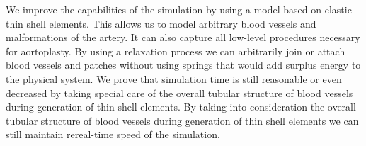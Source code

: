 We improve the capabilities of the simulation by using a model based on elastic thin shell elements.
This allows us to model arbitrary blood vessels and malformations of the artery.
It can also capture all low-level procedures necessary for aortoplasty.
By using a relaxation process we can arbitrarily join or attach blood vessels and patches without using springs that would add surplus energy to the physical system.
We prove that simulation time is still reasonable or even decreased by taking special care of the overall tubular structure of blood vessels during generation of thin shell elements.
By taking into consideration the overall tubular structure of blood vessels during generation of thin shell elements we can still maintain rereal-time speed of the simulation.
\tomas{)}

